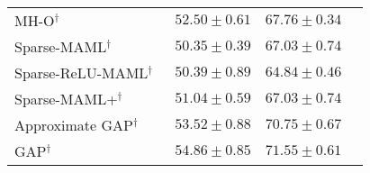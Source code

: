 \begin{table}[t!]
{\begin{tabular}{lccc}
   
    
    MH-O$^{\dagger}$~\cite{zhao2020meta}                           & \quad \; $52.50 \pm 0.61$                     & \quad \; $67.76 \pm 0.34$\\
    Sparse-MAML$^{\dagger}$~\cite{von2021learning}                 & \quad \; $50.35 \pm 0.39$                     & \quad \; $67.03 \pm 0.74$\\
    Sparse-ReLU-MAML$^{\dagger}$~\cite{von2021learning}            & \quad \; $50.39 \pm 0.89$                     & \quad \; $64.84 \pm 0.46$\\
    Sparse-MAML+$^{\dagger}$~\cite{von2021learning}           & \quad \; $51.04 \pm 0.59$                     & \quad \; $67.03 \pm 0.74$\\
    \midrule
    Approximate GAP$^{\dagger}$                                    & \quad \; $53.52 \pm 0.88$                     & \quad \; $70.75 \pm 0.67$\\
    GAP$^{\dagger}$                                              & \quad \; $\mathbf{54.86} \pm \mathbf{0.85}$   & \quad \; $\mathbf{71.55}\pm\mathbf{0.61}$\\
    \bottomrule
  \end{tabular}}
  \label{tab:miniImageNet}
\end{table}

